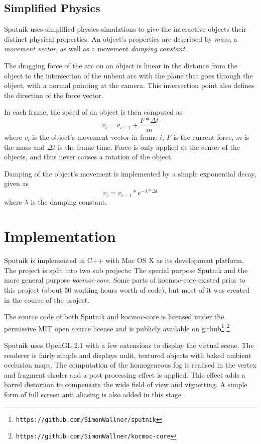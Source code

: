 \documentclass[10pt,a4paper]{scrartcl}
\begin{document}
\subsection{Simplified Physics}
\label{sec:physics}
Sputnik uses simplified physics simulations to give the interactive objects their distinct physical properties. An object's properties are described by \emph{mass}, a \emph{movement vector}, as well as a movement \emph{damping constant}.

The dragging force of the arc on an object is linear in the distance from the object to the intersection of the unbent arc with the plane that goes through the object, with a normal pointing at the camera. This intersection point also defines the direction of the force vector.

In each frame, the speed of an object is then computed as 
\begin{equation}
v_i = v_{i-1} + \frac{F * \Delta t}{m} 
\end{equation}
where $v_i$ is the object's movement vector in frame $i$, $F$ is the current force, $m$ is the mass and $\Delta t$ is the frame time. Force is only applied at the center of the objects, and thus never causes a rotation of the object.

Damping of the object's movement is implemented by a simple exponential decay, given as
\begin{equation}
v_i = v_{i-1} * e^{-\lambda * \Delta t}
\end{equation}
where $\lambda$ is the damping constant.



\section{Implementation}
Sputnik is implemented in C++ with Mac OS X as its development platform. The project is split into two sub projects: The special purpose Sputnik and the more general purpose \emph{kocmoc-core}. Some parts of kocmoc-core existed prior to this project (about 50 working hours worth of code), but most of it was created in the course of the project. 

The source code of both Sputnik and kocmoc-core is licensed under the permissive MIT open source license and is publicly available on github\footnote{\texttt{https://github.com/SimonWallner/sputnik}} \footnote{\texttt{https://github.com/SimonWallner/kocmoc-core}}.

Sputnik uses OpenGL 2.1 with a few extensions to display the virtual scene. The renderer is fairly simple and displays unlit, textured objects with baked ambient occlusion maps. The computation of the homogeneous fog is realised in the vertex and fragment shader and a post processing effect is applied. This effect adds a barrel distortion to compensate the wide field of view and vignetting. A simple form of full screen anti aliasing is also added in this stage.
\end{document}
